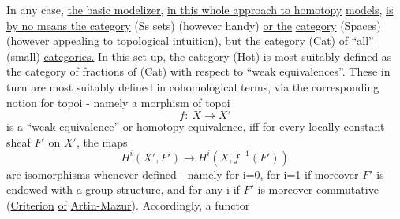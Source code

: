 \margin{$\|$} In any case,  \uline{the basic modelizer,}  \uline{in this whole approach to homotopy}
\uline{models,}  \uline{is by no means the category} (Ss sets)  (however handy)  \uline{or the}
\uline{category} (Spaces)  (however appealing to topological intuition),  \uline{but the}
\uline{category} (Cat) \uline{of} \uline{``all''} (small) \uline{categories.}  In this set-up,  the category
(Hot) is most suitably defined as the category of fractions of (Cat) with
respect to ``weak equivalences''.  These in turn are most suitably defined
in cohomological terms,  via the corresponding notion for topoi  -  namely
a morphism of topoi
\[ f:\ X \longrightarrow X' \]
is a ``weak equivalence'' or homotopy equivalence,  iff for every locally
constant sheaf $F'$ on $X'$, the maps
\[ H^{i}(X',F') \to H^{i}(X,f^{-1}(F')) \]
are isomorphisms whenever defined  -  namely for i=0,  for i=1 if moreover
$F'$ is endowed with a group structure,  and for any i if $F'$ is moreover
commutative (\uline{Criterion} \uline{of} \uline{Artin-Mazur}).  Accordingly,  a functor
